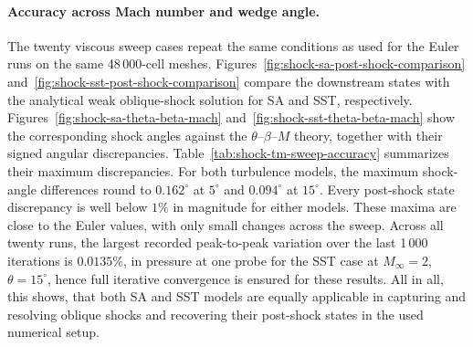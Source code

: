 \paragraph{Accuracy across Mach number and wedge angle.}
The twenty viscous sweep cases repeat the same conditions as used for the Euler runs on the same
48\,000-cell meshes. Figures~\ref{fig:shock-sa-post-shock-comparison}
and~\ref{fig:shock-sst-post-shock-comparison} compare the downstream states
with the analytical weak oblique-shock solution for SA and SST, respectively.
Figures~\ref{fig:shock-sa-theta-beta-mach}
and~\ref{fig:shock-sst-theta-beta-mach} show the corresponding shock angles
against the \(\theta\)--\(\beta\)--\(M\) theory, together with their signed
angular discrepancies. Table~\ref{tab:shock-tm-sweep-accuracy} summarizes their
maximum discrepancies. For both turbulence models, the maximum
shock-angle differences round to \(0.162^\circ\) at \(5^\circ\) and
\(0.094^\circ\) at \(15^\circ\). Every post-shock state discrepancy is well below
\(1\%\) in magnitude for either models. These maxima are
close to the Euler values, with only small changes across the sweep. Across all twenty runs, the largest recorded peak-to-peak variation over the last
1\,000 iterations is \(0.0135\%\), in pressure at one probe for the SST case
at \(M_\infty=2\), \(\theta=15^\circ\), hence full iterative convergence is ensured for these results. All in all, this shows, that both SA and SST models are equally applicable in capturing and resolving oblique shocks and recovering their post-shock states in the used numerical setup. 

